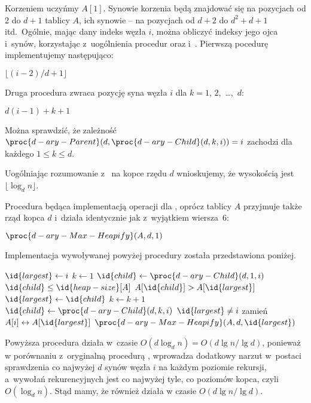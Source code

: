 
\subproblem %
Korzeniem  uczyńmy $A[1]$. Synowie korzenia będą znajdować się na pozycjach od 2 do $d+1$ tablicy $A$, ich synowie -- na pozycjach od $d+2$ do $d^2+d+1$ itd.\ Ogólnie, mając dany indeks węzła $i$, można obliczyć indeksy jego ojca i~synów, korzystając z~uogólnienia procedur  oraz  i~. Pierwszą pocedurę implementujemy następująco:
\begin{codebox}
\li	\Return $\lfloor(i-2)/d+1\rfloor$
\end{codebox}
Druga procedura zwraca pozycję  syna węzła $i$ dla $k=1$, 2,~\dots,~$d$:
\begin{codebox}
\li	\Return $d(i-1)+k+1$
\end{codebox}
Można sprawdzić, że zależność $\proc{d-ary-Parent}(d,\proc{d-ary-Child}(d,k,i))=i$ zachodzi dla każdego $1\le k\le d$.

\subproblem %
Uogólniając rozumowanie z~ na kopce rzędu $d$ wnioskujemy, że wysokością  jest $\lfloor\log_dn\rfloor$.

\subproblem %
Procedura  będąca implementacją operacji  dla , oprócz tablicy $A$ przyjmuje także rząd kopca $d$ i~działa identycznie jak  z~wyjątkiem wiersza~6:
\begin{codebox}
\setcounter{codelinenumber}{5}
\li	$\proc{d-ary-Max-Heapify}(A,d,1)$
\end{codebox}
Implementacja wywoływanej powyżej procedury została przedstawiona poniżej.
\begin{codebox}
\li	$\id{largest}\gets i$
\li	$k\gets1$
\li	$\id{child}\gets\proc{d-ary-Child}(d,1,i)$
\li	\While $\id{child}\le\id{heap-size}[A]$
\li		\Do
			\If $A[\id{child}]>A[\id{largest}]$
\li				\Then $\id{largest}\gets\id{child}$
				\End
\li			$k\gets k+1$
\li			$\id{child}\gets\proc{d-ary-Child}(d,k,i)$
		\End
\li	\If $\id{largest}\ne i$
\li		\Then
			zamień $A[i]\leftrightarrow A[\id{largest}]$
\li			$\proc{d-ary-Max-Heapify}(A,d,\id{largest})$
		\End
\end{codebox}
Powyższa procedura działa w~czasie $O(d\log_dn)=O(d\lg n/\!\lg d)$, ponieważ w porównaniu z~oryginalną procedurą , wprowadza dodatkowy narzut w~postaci sprawdzenia co najwyżej $d$ synów węzła $i$ na każdym poziomie rekursji, a~wywołań rekurencyjnych jest co najwyżej tyle, co poziomów kopca, czyli $O(\log_dn)$. Stąd mamy, że również  działa w czasie $O(d\lg n/\!\lg d)$.

